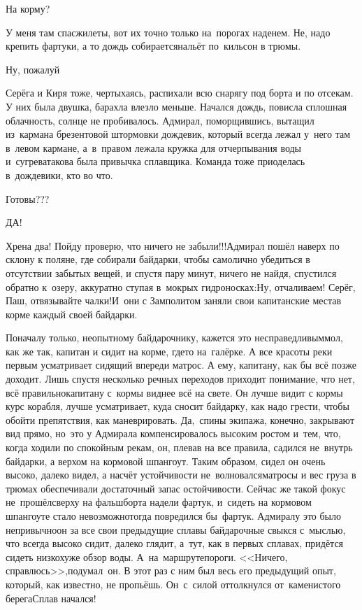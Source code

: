 \diagdash На корму?

\diagdash У меня там спасжилеты, вот их точно только на~порогах наденем. Не, надо крепить фартуки, а то дождь собирается\mdash нальёт по~кильсон в трюмы.

\diagdash Ну, пожалуй\myldots{}

Серёга и Киря тоже, чертыхаясь, распихали всю снарягу под борта и по отсекам. У них была двушка, барахла влезло меньше. Начался дождь, повисла сплошная облачность, солнце не пробивалось. Адмирал, поморщившись, вытащил из~кармана брезентовой штормовки дождевик, который всегда лежал у~него там в~левом кармане, а~в~правом лежала кружка для отчерпывания воды и~сугрева\mdash такова была привычка сплавщика. Команда тоже приоделась в~дождевики, кто во что.

\diagdash Готовы???

\diagdash ДА!

\diagdash Хрена два! Пойду проверю, что ничего не забыли!!!\mdash Адмирал пошёл наверх по склону к поляне, где собирали байдарки, чтобы самолично убедиться в отсутствии забытых вещей, и спустя пару минут, ничего не найдя, спустился обратно к~озеру, аккуратно ступая в~мокрых гидроносках:\mdash Ну, отчаливаем! Серёг, Паш, отвязывайте чалки!\mdash И~они с Замполитом заняли свои капитанские места\mdash в корме каждый своей байдарки. 

Поначалу только, неопытному байдарочнику, кажется это несправедливым\mdash мол, как же так, капитан и сидит на корме, где\sdash то на~галёрке. А все красоты реки первым усматривает сидящий впереди матрос. А ему, капитану, как бы всё позже доходит. Лишь спустя несколько речных переходов приходит понимание, что нет, всё правильно\mdash капитану с~кормы виднее всё на свете. Он лучше видит с кормы курс корабля, лучше усматривает, куда сносит байдарку, как надо грести, чтобы обойти препятствия, как маневрировать. Да,~спины экипажа, конечно, закрывают вид прямо, но~это у Адмирала компенсировалось высоким ростом и~тем, что, когда ходили по спокойным рекам, он, плевав на все правила, садился не~внутрь байдарки, а верхом на кормовой шпангоут. Таким образом, сидел он очень высоко, далеко видел, а насчёт устойчивости не~волновался\mdash матросы и вес груза в трюмах обеспечивали достаточный запас остойчивости. Сейчас же такой фокус не~прошёл\mdash сверху на фальшборта надели фартук, и~сидеть на кормовом шпангоуте стало невозможно\mdash тогда повредился бы~фартук. Адмиралу это было непривычно\mdash он за все свои предыдущие сплавы байдарочные свыкся с~мыслью, что всегда высоко сидит, далеко глядит, а~тут, как в первых сплавах, придётся сидеть низко\mdash хуже обзор воды. А~на~маршруте\mdash пороги. <<Ничего, справлюсь>>,\mdash подумал~он. В этот раз с ним был весь его предыдущий опыт, который, как известно, не пропьёшь. Он~с~силой оттолкнулся от~каменистого берега\mdash Сплав начался!

